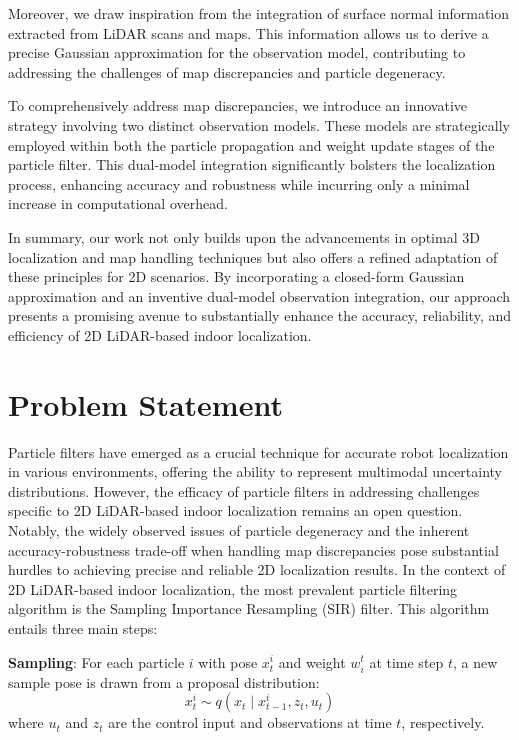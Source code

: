\documentclass[rnd]{mas_proposal}
\begin{document}
Moreover, we draw inspiration from the integration of surface normal information extracted from LiDAR scans and maps. This information allows us to derive a precise Gaussian approximation for the observation model, contributing to addressing the challenges of map discrepancies and particle degeneracy.

To comprehensively address map discrepancies, we introduce an innovative strategy involving two distinct observation models. These models are strategically employed within both the particle propagation and weight update stages of the particle filter. This dual-model integration significantly bolsters the localization process, enhancing accuracy and robustness while incurring only a minimal increase in computational overhead\cite{10160274}.

In summary, our work not only builds upon the advancements in optimal 3D localization and map handling techniques but also offers a refined adaptation of these principles for 2D scenarios. By incorporating a closed-form Gaussian approximation and an inventive dual-model observation integration, our approach presents a promising avenue to substantially enhance the accuracy, reliability, and efficiency of 2D LiDAR-based indoor localization.

\section{Problem Statement}
Particle filters have emerged as a crucial technique for accurate robot localization in various environments, offering the ability to represent multimodal uncertainty distributions. However, the efficacy of particle filters in addressing challenges specific to 2D LiDAR-based indoor localization remains an open question. Notably, the widely observed issues of particle degeneracy and the inherent accuracy-robustness trade-off when handling map discrepancies pose substantial hurdles to achieving precise and reliable 2D localization results.
In the context of 2D LiDAR-based indoor localization, the most prevalent particle filtering algorithm is the Sampling Importance Resampling (SIR) filter\cite{Rubin1988UsingTS}. This algorithm entails three main steps:

\textbf{Sampling}: For each particle $i$ with pose $x^i_t$ and weight $w^t_i$ at time step $t$, a new sample pose is drawn from a proposal distribution:
\begin{equation}
    x^{i}_{t} \sim {q}(x_{t} \mid x^{i}_{t-1},z_{t},u_{t})
\end{equation}
where $u_t$ and $z_t$ are the control input and observations at time $t$, respectively.
\end{document}

